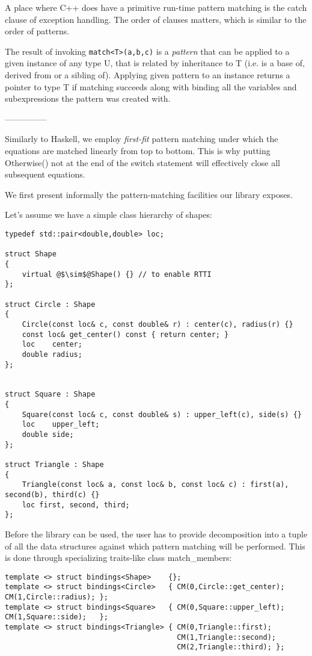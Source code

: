 \documentclass[preprint]{sigplanconf}
\DeclareRobustCommand{\code}[1]{{\lstinline[breaklines=false]{#1}}}
\begin{document}
A place where C++ does have a primitive run-time pattern matching is the catch 
clause of exception handling. The order of clauses matters, which is similar to 
the order of patterns. 

The result of invoking \code{match<T>(a,b,c)} is a \emph{pattern} that can be applied 
to a given instance of any type U, that is related by inheritance to T (i.e. is 
a base of, derived from or a sibling of). Applying given pattern to an instance 
returns a pointer to type T if matching succeeds along with binding all the 
variables and subexpressions the pattern was created with.

---------------

Similarly to Haskell, we employ \emph{first-fit} pattern matching under which the 
equations are matched linearly from top to bottom. This is why putting 
Otherwise() not at the end of the switch statement will effectively close all 
subsequent equations.

We first present informally the pattern-matching facilities our library exposes.

Let's assume we have a simple class hierarchy of shapes:

\begin{lstlisting}
typedef std::pair<double,double> loc;

struct Shape
{
    virtual @$\sim$@Shape() {} // to enable RTTI
};

struct Circle : Shape
{
    Circle(const loc& c, const double& r) : center(c), radius(r) {}
    const loc& get_center() const { return center; }
    loc    center;
    double radius;
};


struct Square : Shape
{
    Square(const loc& c, const double& s) : upper_left(c), side(s) {}
    loc    upper_left;
    double side;
};

struct Triangle : Shape
{
    Triangle(const loc& a, const loc& b, const loc& c) : first(a), second(b), third(c) {}
    loc first, second, third;
};
\end{lstlisting}

Before the library can be used, the user has to provide decomposition into a 
tuple of all the data structures against which pattern matching will be 
performed. This is done through specializing traits-like class match\_members:

\begin{lstlisting}
template <> struct bindings<Shape>    {};
template <> struct bindings<Circle>   { CM(0,Circle::get_center); CM(1,Circle::radius); };
template <> struct bindings<Square>   { CM(0,Square::upper_left); CM(1,Square::side);   };
template <> struct bindings<Triangle> { CM(0,Triangle::first);    
                                        CM(1,Triangle::second); 
                                        CM(2,Triangle::third); };
\end{lstlisting}
\end{document}
